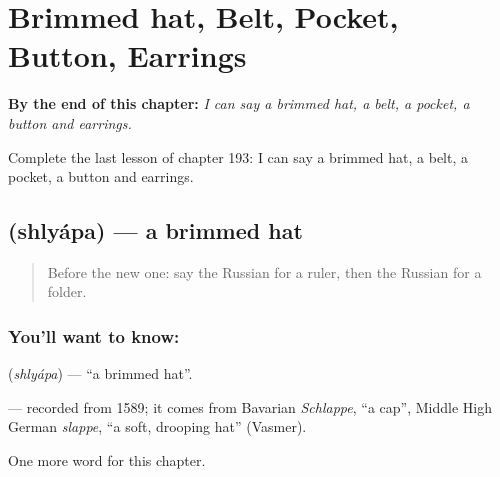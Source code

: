 
\chapter{Brimmed hat, Belt, Pocket, Button, Earrings}
\label{ch:ru-brimmed-hat-belt-pocket-button-earrings}

\begin{chapteropening}
\textbf{By the end of this chapter:} \emph{I can say a brimmed hat, a belt, a pocket, a button and earrings.}

Complete the last lesson of chapter 193: I can say a brimmed hat, a belt, a pocket, a button and earrings.
\end{chapteropening}

\section[\texorpdfstring{\ru{шляпа} (shlyápa)}{шляпа (shlyápa)}]{ (shlyápa) — a brimmed hat}

\label{lesson:RU-C193-shlyapa}



\begin{quote}
Before the new one: say the Russian for a ruler, then the Russian for a folder.
\end{quote}

\subsection*{You'll want to know: }
\textbf{} (\emph{shlyápa}) — \textquotedblleft{}a brimmed hat\textquotedblright{}.

\begin{cousinweb}
\textbf{} — recorded from 1589; it comes from Bavarian \emph{Schlappe}, \textquotedblleft{}a cap\textquotedblright{}, Middle High German \emph{slappe}, \textquotedblleft{}a soft, drooping hat\textquotedblright{} (Vasmer).
\end{cousinweb}

\begin{grammarlens}[title={What you've built}]
One more word for this chapter.
\end{grammarlens}

